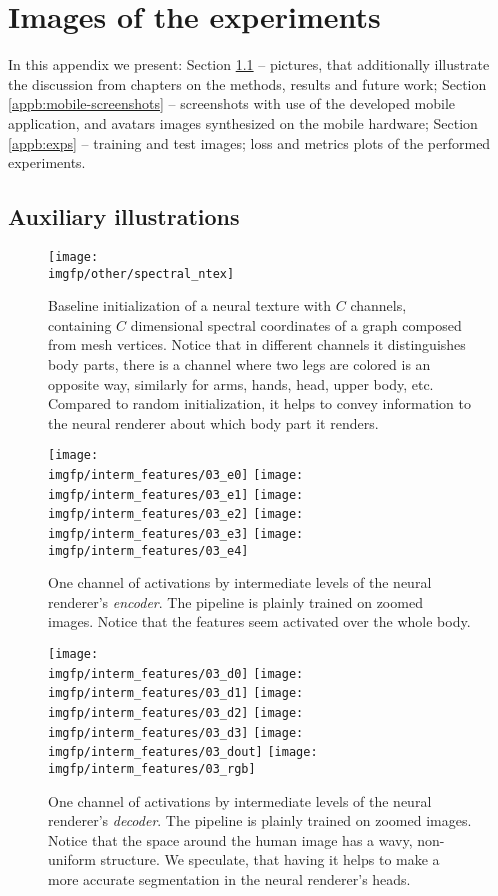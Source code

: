 \chapter{Images of the experiments}
In this appendix we present: Section \ref{appb:fig} -- pictures, that additionally illustrate the discussion from chapters on the methods, results and future work; Section \ref{appb:mobile-screenshots} -- screenshots with use of the developed mobile application, and avatars images synthesized on the mobile hardware; Section \ref{appb:exps} -- training and test images; loss and metrics plots of the performed experiments.


\section{Auxiliary illustrations}
\label{appb:fig}
\begin{figure}[!h]
	\centering
	\texttt{[image: \\imgfp/other/spectral\_ntex]}
	\caption{Baseline initialization of a neural texture with $C$ channels, containing $C$ dimensional spectral coordinates of a graph composed from mesh vertices. Notice that in different channels it distinguishes body parts, there is a channel where two legs are colored is an opposite way, similarly for arms, hands, head, upper body, etc. Compared to random initialization, it helps to convey information to the neural renderer about which body part it renders.}
	\label{fig:spectral_ntex}
\end{figure}
\begin{figure}
	\centering
	\texttt{[image: \\imgfp/interm\_features/03\_e0]}%
	\hfill\texttt{[image: \\imgfp/interm\_features/03\_e1]}%
	\hfill\texttt{[image: \\imgfp/interm\_features/03\_e2]}%
	\hfill\texttt{[image: \\imgfp/interm\_features/03\_e3]}%
	\hfill\texttt{[image: \\imgfp/interm\_features/03\_e4]}%
	\caption{One channel of activations by intermediate levels of the neural renderer's \textit{encoder}. The pipeline is plainly trained on zoomed images. Notice that the features seem activated over the whole body.}
	\label{fig:interm03_encoder}
\end{figure}
\begin{figure}
	\centering
	\texttt{[image: \\imgfp/interm\_features/03\_d0]}%
	\hfill\texttt{[image: \\imgfp/interm\_features/03\_d1]}%
	\hfill\texttt{[image: \\imgfp/interm\_features/03\_d2]}%
	\hfill\texttt{[image: \\imgfp/interm\_features/03\_d3]}%
	\hfill\texttt{[image: \\imgfp/interm\_features/03\_dout]}%
	\hfill\texttt{[image: \\imgfp/interm\_features/03\_rgb]}
	\caption{One channel of activations by intermediate levels of the neural renderer's \textit{decoder}. The pipeline is plainly trained on zoomed images. Notice that the space around the human image has a wavy, non-uniform structure. We speculate, that having it helps to make a more accurate segmentation in the neural renderer's heads. }
	\label{fig:interm03_decoder}
\end{figure}
